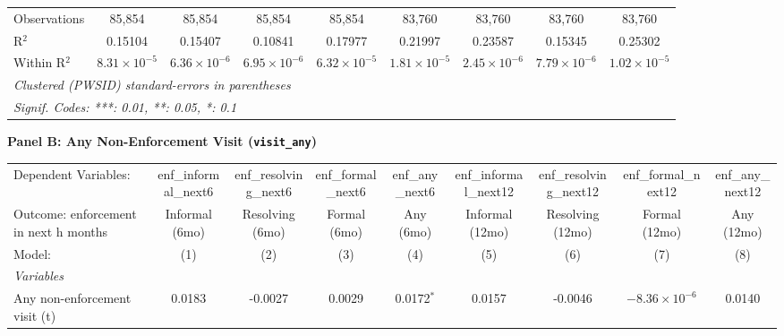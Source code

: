 \begin{table}[htbp]
\begin{adjustbox}{width = \textwidth, center}
\begin{tabular}{lcccccccc}
   Observations                          & 85,854                 & 85,854                  & 85,854                & 85,854                & 83,760                  & 83,760                   & 83,760                & 83,760\\  
   R$^2$                                 & 0.15104                & 0.15407                 & 0.10841               & 0.17977               & 0.21997                 & 0.23587                  & 0.15345               & 0.25302\\  
   Within R$^2$                          & $8.31\times 10^{-5}$   & $6.36\times 10^{-6}$    & $6.95\times 10^{-6}$  & $6.32\times 10^{-5}$  & $1.81\times 10^{-5}$    & $2.45\times 10^{-6}$     & $7.79\times 10^{-6}$  & $1.02\times 10^{-5}$\\   
   \midrule \midrule
   \multicolumn{9}{l}{\emph{Clustered (PWSID) standard-errors in parentheses}}\\
   \multicolumn{9}{l}{\emph{Signif. Codes: ***: 0.01, **: 0.05, *: 0.1}}\\
\end{tabular}
\par\endgroup
\end{adjustbox}
\vspace{8pt}
\textbf{Panel B: Any Non-Enforcement Visit (\texttt{visit\_any})}\\[4pt]
\begin{adjustbox}{width = \textwidth, center}
\begingroup
\centering
\begin{tabular}{lcccccccc}
   \tabularnewline \midrule \midrule
   Dependent Variables:                  & enf\_informal\_next6   & enf\_resolving\_next6   & enf\_formal\_next6    & enf\_any\_next6       & enf\_informal\_next12   & enf\_resolving\_next12   & enf\_formal\_next12    & enf\_any\_next12\\    
   Outcome: enforcement in next h months & Informal (6mo)         & Resolving (6mo)         & Formal (6mo)          & Any (6mo)             & Informal (12mo)         & Resolving (12mo)         & Formal (12mo)          & Any (12mo) \\   
   Model:                                & (1)                    & (2)                     & (3)                   & (4)                   & (5)                     & (6)                      & (7)                    & (8)\\  
   \midrule
   \emph{Variables}\\
   Any non-enforcement visit (t)         & 0.0183                 & -0.0027                 & 0.0029                & 0.0172$^{*}$          & 0.0157                  & -0.0046                  & $-8.36\times 10^{-6}$  & 0.0140\\   

\end{tabular}
\end{adjustbox}
\end{table}
